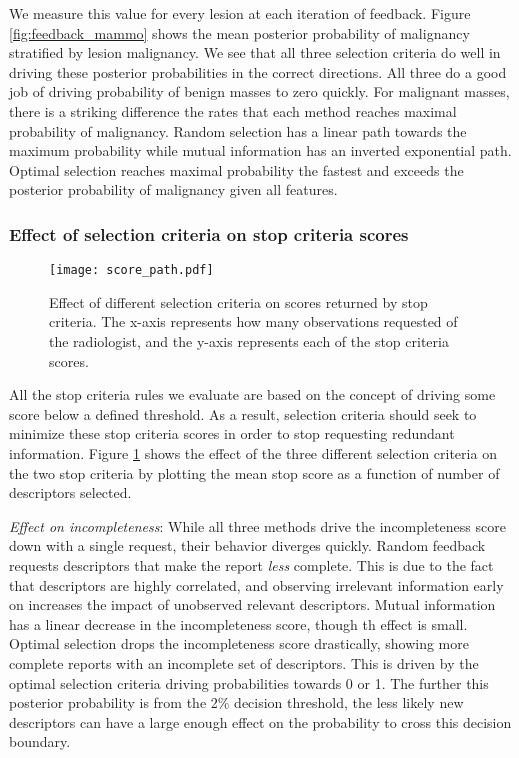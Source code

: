We measure this value for every lesion at each iteration of feedback. Figure \ref{fig:feedback_mammo} shows the mean posterior probability of malignancy stratified by lesion malignancy. We see that all three selection criteria do well in driving these posterior probabilities in the correct directions. All three do a good job of driving probability of benign masses to zero quickly. For malignant masses, there is a striking difference the rates that each method reaches maximal probability of malignancy. Random selection has a linear path towards the maximum probability while mutual information has an inverted exponential path. Optimal selection reaches maximal probability the fastest and exceeds the posterior probability of malignancy given all features.

\subsubsection{Effect of selection criteria on stop criteria scores}

\begin{figure}[h]
	\centering
	\texttt{[image: score\_path.pdf]}
	\caption[Effect of selection criteria on stop criteria scores]{Effect of different selection criteria on scores returned by stop criteria. The x-axis represents how many observations requested of the radiologist, and the y-axis represents each of the stop criteria scores.}
	\label{fig:feedback_score_path}
\end{figure} 

All the stop criteria rules we evaluate are based on the concept of driving some score below a defined threshold. As a result, selection criteria should seek to minimize these stop criteria scores in order to stop requesting redundant information. Figure \ref{fig:feedback_score_path} shows the effect of the three different selection criteria on the two stop criteria by plotting the mean stop score as a function of number of descriptors selected.

\emph{Effect on incompleteness}:
While all three methods drive the incompleteness score down with a single request, their behavior diverges quickly. Random feedback requests descriptors that make the report \emph{less} complete. This is due to the fact that descriptors are highly correlated, and observing irrelevant information early on increases the impact of unobserved relevant descriptors. Mutual information has a linear decrease in the incompleteness score, though th effect is small. Optimal selection drops the incompleteness score drastically, showing more complete reports with an incomplete set of descriptors. This is driven by the optimal selection criteria driving probabilities towards 0 or 1. The further this posterior probability is from the 2\% decision threshold, the less likely new descriptors can have a large enough effect on the probability to cross this decision boundary.

